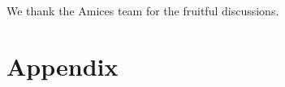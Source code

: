 \documentclass[bimj,fleqn]{w-art}
\begin{document}

\begin{acknowledgement}
We thank the Amices team for the fruitful discussions.
\end{acknowledgement}
\vspace*{1pc}



\section*{Appendix}


% 
% 
\end{document}
